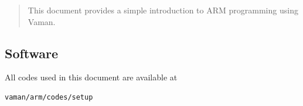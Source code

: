 \documentclass[journal,12pt,twocolumn]{IEEEtran}
\begin{document}
%




%

\begin{abstract}
This document provides a simple introduction to ARM programming using Vaman.


\end{abstract}

%
\fi
\subsection{Software}
%
All codes used in this document are available at  
\begin{lstlisting}
vaman/arm/codes/setup
\end{lstlisting}
\end{document}
